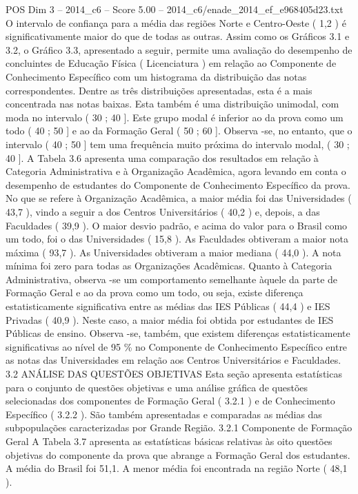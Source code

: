 \begin{textsample}{POS Dim 3 – 2014\_c6 – Score 5.00 – 2014\_c6/enade\_2014\_ef\_e968405d23.txt}
O intervalo de confiança para a média das regiões Norte e Centro-Oeste ( 1,2 ) é significativamente maior do que de todas as outras.
Assim como os Gráficos 3.1 e 3.2, o Gráfico 3.3, apresentado a seguir, permite uma avaliação do desempenho de concluintes de Educação Física ( Licenciatura ) em relação ao Componente de Conhecimento Específico com um histograma da distribuição das notas correspondentes.
Dentre as três distribuições apresentadas, esta é a mais concentrada nas notas baixas.
Esta também é uma distribuição unimodal, com moda no intervalo ( 30 ; 40 ].
Este grupo modal é inferior ao da prova como um todo ( 40 ; 50 ] e ao da Formação Geral ( 50 ; 60 ].
Observa -se, no entanto, que o intervalo ( 40 ; 50 ] tem uma frequência muito próxima do intervalo modal, ( 30 ; 40 ].
A Tabela 3.6 apresenta uma comparação dos resultados em relação à Categoria Administrativa e à Organização Acadêmica, agora levando em conta o desempenho de estudantes do Componente de Conhecimento Específico da prova.
No que se refere à Organização Acadêmica, a maior média foi das Universidades ( 43,7 ), vindo a seguir a dos Centros Universitários ( 40,2 ) e, depois, a das Faculdades ( 39,9 ).
O maior desvio padrão, e acima do valor para o Brasil como um todo, foi o das Universidades ( 15,8 ).
As Faculdades obtiveram a maior nota máxima ( 93,7 ).
As Universidades obtiveram a maior mediana ( 44,0 ).
A nota mínima foi zero para todas as Organizações Acadêmicas.
Quanto à Categoria Administrativa, observa -se um comportamento semelhante àquele da parte de Formação Geral e ao da prova como um todo, ou seja, existe diferença estatisticamente significativa entre as médias das IES Públicas ( 44,4 ) e IES Privadas ( 40,9 ).
Neste caso, a maior média foi obtida por estudantes de IES Públicas de ensino.
Observa -se, também, que existem diferenças estatisticamente significativas ao nível de 95 \% no Componente de Conhecimento Específico entre as notas das Universidades em relação aos Centros Universitários e Faculdades. 3.2 ANÁLISE DAS QUESTÕES OBJETIVAS Esta seção apresenta estatísticas para o conjunto de questões objetivas e uma análise gráfica de questões selecionadas dos componentes de Formação Geral ( 3.2.1 ) e de Conhecimento Específico ( 3.2.2 ).
São também apresentadas e comparadas as médias das subpopulações caracterizadas por Grande Região. 3.2.1 Componente de Formação Geral A Tabela 3.7 apresenta as estatísticas básicas relativas às oito questões objetivas do componente da prova que abrange a Formação Geral dos estudantes.
A média do Brasil foi 51,1.
A menor média foi encontrada na região Norte ( 48,1 ).

\end{textsample}
